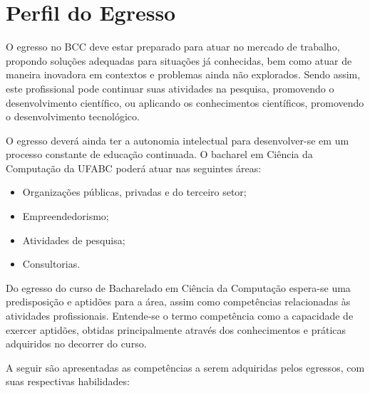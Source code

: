 \section{Perfil do Egresso}

O egresso no BCC deve estar preparado para atuar no mercado de trabalho, propondo
soluções adequadas para situações já conhecidas, bem como atuar de maneira inovadora em contextos e problemas ainda não explorados. Sendo assim, este profissional pode continuar suas atividades na pesquisa, promovendo o desenvolvimento científico, ou aplicando os conhecimentos científicos, promovendo o desenvolvimento tecnológico.

O egresso deverá ainda ter a autonomia intelectual para desenvolver-se em um processo constante de educação continuada.
O bacharel em Ciência da Computação da UFABC poderá atuar nas seguintes áreas:
\begin{itemize}
	\item Organizações públicas, privadas e do terceiro setor;
	\item Empreendedorismo;
	\item Atividades de pesquisa;
	\item Consultorias.
\end{itemize}

Do egresso do curso de Bacharelado em Ciência da Computação espera-se uma
predisposição e aptidões para a área, assim como competências relacionadas às atividades profissionais. Entende-se o termo competência como a capacidade de exercer aptidões, obtidas principalmente através dos conhecimentos e práticas adquiridos no decorrer do curso.

A seguir são apresentadas as competências a serem adquiridas pelos egressos, com suas respectivas habilidades:
